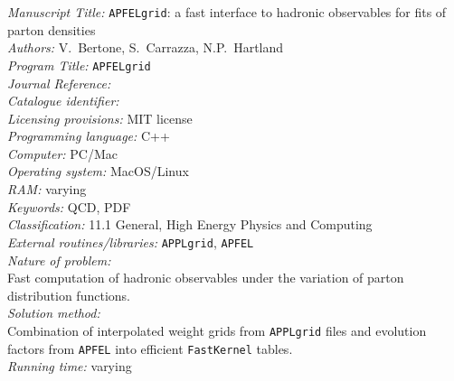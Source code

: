 \documentclass[preprint,12pt]{elsarticle}
\newcounter{bla}
\begin{document}
\begin{small}
\noindent
{\em Manuscript Title:} {\tt APFELgrid}: a fast interface to hadronic observables for
  fits of parton densities                                      \\
{\em Authors:} V.~Bertone, S.~Carrazza, N.P.~Hartland                                               \\
{\em Program Title:} {\tt APFELgrid}                                          \\
{\em Journal Reference:}                                      \\
{\em Catalogue identifier:}                                   \\
{\em Licensing provisions:}   MIT license                                \\
{\em Programming language:}  C++                                 \\
{\em Computer:} PC/Mac                                               \\
{\em Operating system:} MacOS/Linux                                       \\
{\em RAM:} varying                                              \\
{\em Keywords:} QCD, PDF\\
{\em Classification:}  11.1 General, High Energy Physics and Computing                                       \\
{\em External routines/libraries:}  {\tt APPLgrid}, {\tt APFEL}                          \\
{\em Nature of problem:}\\
 Fast computation of hadronic observables under the variation of parton distribution functions.
   \\
{\em Solution method:}\\
  Combination of interpolated weight grids from {\tt APPLgrid} files and evolution factors from {\tt APFEL} into efficient {\tt FastKernel} tables.\\
{\em Running time:} varying\\
   \\
\end{small}
\end{document}
